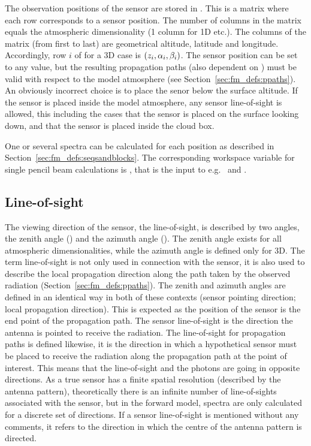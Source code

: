 The observation positions of the sensor are stored in
. This is a matrix where each row corresponds to
a sensor position. The number of columns in the matrix equals the
atmospheric dimensionality (1 column for 1D etc.). The columns of the
matrix (from first to last) are geometrical altitude, latitude and longitude.
Accordingly, row $i$ of  for a 3D case is
$(z_{i},\alpha_{i},\beta_{i})$. The sensor position can be set to any
value, but the resulting propagation paths (also dependent on
) must be valid with respect to the model
atmosphere (see Section~\ref{sec:fm_defs:ppaths}). An obviously
incorrect choice is to place the senor below the surface altitude. If
the sensor is placed inside the model atmosphere, any sensor
line-of-sight is allowed, this including the cases that the sensor is
placed on the surface looking down, and that the sensor is placed
inside the cloud box. 

One or several spectra can be calculated for each position as described in
Section~\ref{sec:fm_defs:seqsandblocks}. The corresponding workspace variable
for single pencil beam calculations is , that is the input
to e.g.\  and . 



\subsection{Line-of-sight}
\label{sec:fm_defs:los}

The viewing direction of the sensor, the line-of-sight, is described
by two angles, the zenith angle (\ZntAng) and the azimuth angle
(\AzmAng). The zenith angle exists for all atmospheric
dimensionalities, while the azimuth angle is defined only for 3D.
The term line-of-sight is not only used in connection with the sensor,
it is also used to describe the local propagation direction along the
path taken by the observed radiation
(Section~\ref{sec:fm_defs:ppaths}).  The zenith and azimuth angles
are defined in an identical way in both of these contexts (sensor
pointing direction; local propagation direction). This is expected as
the position of the sensor is the end point of the propagation path.
The sensor line-of-sight is the direction the antenna is pointed to
receive the radiation. The line-of-sight for propagation paths is
defined likewise, it is the direction in which a hypothetical sensor
must be placed to receive the radiation along the propagation path at
the point of interest. This means that the line-of-sight and the
photons are going in opposite directions. As a true sensor has a
finite spatial resolution (described by the antenna pattern),
theoretically there is an infinite number of line-of-sights associated
with the sensor, but in the forward model, spectra are only calculated
for a discrete set of directions. If a sensor line-of-sight is
mentioned without any comments, it refers to the direction in which
the centre of the antenna pattern is directed.

